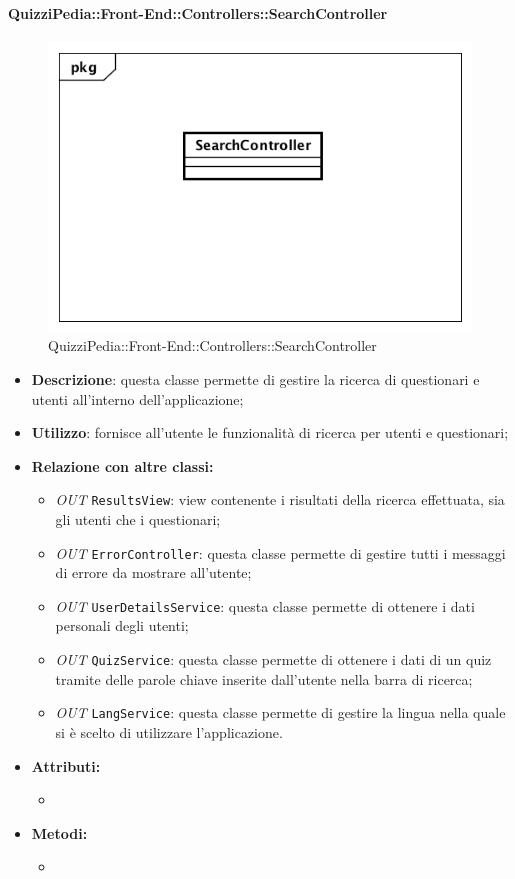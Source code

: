 \paragraph{QuizziPedia::Front-End::Controllers::SearchController}
\begin{figure}
	\centering
	\includegraphics[scale=0.45]{UML/Classi/Front-End/QuizziPedia_Front-end_Controller_SearchController.png}
	\caption{QuizziPedia::Front-End::Controllers::SearchController}
\end{figure}
\begin{itemize}
	\item \textbf{Descrizione}: questa classe permette di gestire la ricerca di questionari e utenti all'interno dell'applicazione;
	\item \textbf{Utilizzo}: fornisce all'utente le funzionalità di ricerca per utenti e questionari;
	\item \textbf{Relazione con altre classi:}
	\begin{itemize}
		\item \textit{OUT} \texttt{ResultsView}: view contenente i risultati della ricerca effettuata, sia gli utenti che i questionari;
		\item \textit{OUT} \texttt{ErrorController}: questa classe permette di gestire tutti i messaggi di errore da mostrare all'utente;
		\item \textit{OUT} \texttt{UserDetailsService}: questa classe permette di ottenere i dati personali degli utenti;
		\item \textit{OUT} \texttt{QuizService}: questa classe permette di ottenere i dati di un quiz tramite delle parole chiave inserite dall'utente nella barra di ricerca;
		\item \textit{OUT} \texttt{LangService}: questa classe permette di gestire la lingua nella quale si è scelto di utilizzare l'applicazione.
	\end{itemize}
	\item \textbf{Attributi:}
	\begin{itemize}
		\item 
	\end{itemize}
	\item \textbf{Metodi:}
	\begin{itemize}
		\item 
	\end{itemize}
\end{itemize}

